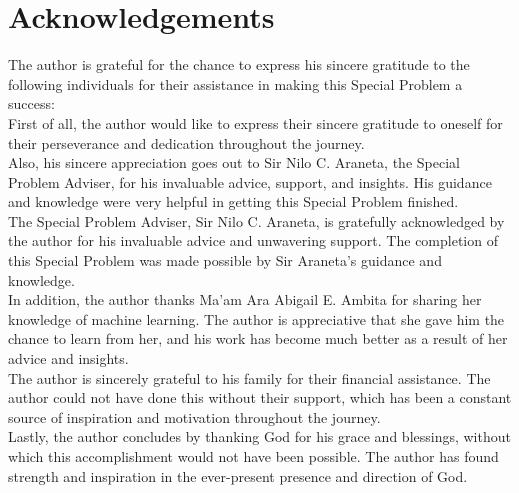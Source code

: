 \chapter{Acknowledgements}
\label{sec:appendix_e}
The author is grateful for the chance to express his sincere gratitude to the following 
individuals for their assistance in making this Special Problem a success:
\\

First of all, the author would like to express their sincere gratitude to oneself 
for their perseverance and dedication throughout the journey.
\\

Also, his sincere appreciation goes out to Sir Nilo C. Araneta, 
the Special Problem Adviser, for his invaluable advice, support, and insights. 
His guidance and knowledge were very helpful in getting this Special Problem finished.
\\

The Special Problem Adviser, Sir Nilo C. Araneta, is gratefully acknowledged by the author 
for his invaluable advice and unwavering support. The completion of this Special Problem was made 
possible by Sir Araneta's guidance and knowledge.
\\

In addition, the author thanks Ma'am Ara Abigail E. Ambita for 
sharing her knowledge of machine learning. The author is appreciative that she gave 
him the chance to learn from her, and his work has become much better as a result of her 
advice and insights.
\\

The author is sincerely grateful to his family for their financial assistance. 
The author could not have done this without their support, which has been a constant 
source of inspiration and motivation throughout the journey.
\\

Lastly, the author concludes by thanking God for his grace and blessings, without which this 
accomplishment would not have been possible. The author has found strength and inspiration 
in the ever-present presence and direction of God.
\\